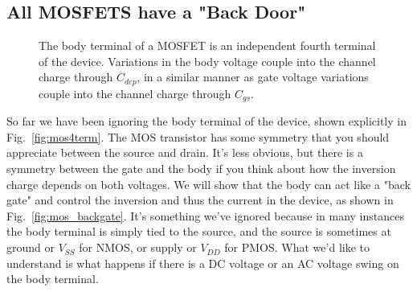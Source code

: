 \subsection{All MOSFETS have a "Back Door"}
\begin{figure}[b]
\centering
{}
\caption{The body terminal of a MOSFET is an independent fourth terminal of the device.  Variations in the body voltage couple into the channel charge through $C_{dep}$, in a similar manner as gate voltage variations couple into the channel charge through $C_{gs}$.} 
\end{figure}
So far we have been ignoring the body terminal of the device, shown explicitly in Fig.~\ref{fig:mos4term}.  The MOS transistor has some symmetry that you should appreciate between the source and drain.  It's less obvious, but there is a symmetry between the gate and the body if you think about how the inversion charge depends on both voltages. We will show that the body can act like a "back gate" and control the inversion and thus the current in the device, as shown in Fig.~\ref{fig:mos_backgate}.  It's something we've ignored because in many instances the body terminal is simply tied to the source, and the source is sometimes at ground or $V_{SS}$ for NMOS, or supply or $V_{DD}$ for PMOS.  What we'd like to understand is what happens if there is a DC voltage or an AC voltage swing on the body terminal.
